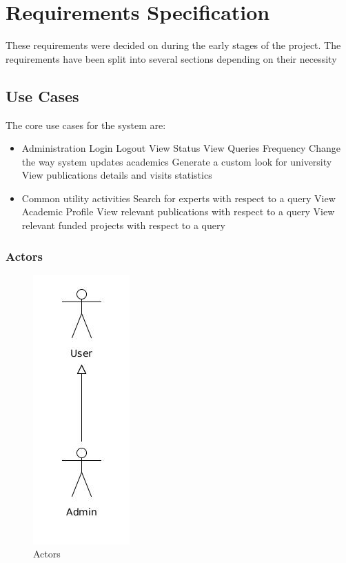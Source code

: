
\section{Requirements Specification}
These requirements were decided on during the early stages of the project. The requirements have been split into several 
sections depending on their necessity

\subsection{Use Cases}
The core use cases for the system are:
\begin{itemize}
 \item Administration
 \subitem Login
 \subitem Logout
 \subitem View Status
 \subitem View Queries Frequency
 \subitem Change the way system updates academics
 \subitem Generate a custom look for university
 \subitem View publications details and visits statistics
 
 \item Common utility activities
 \subitem Search for experts with respect to a query
 \subitem View Academic Profile
 \subitem View relevant publications with respect to a query
 \subitem View relevant funded projects with respect to a query
\end{itemize}

\subsubsection{Actors}

\begin{figure}
\centering
\includegraphics[scale=0.4]{./figures/actors.jpg}
\caption{Actors}
\end{figure}

